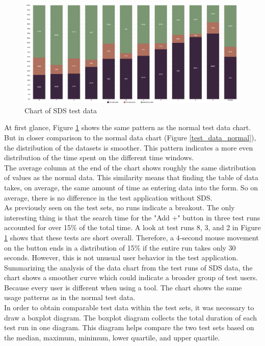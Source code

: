 \begin{figure}[htbp]
    \centerline{
    \includegraphics[width=\linewidth]{images/sds_test_data_chart.png}}
\caption{Chart of \ac{SDS} test data}
\label{test_data_sds}
\end{figure}
At first glance, Figure \ref{test_data_sds} shows the same pattern as the normal test data chart. But in closer comparison to the normal data chart (Figure \ref{test_data_normal}), the distribution of the datasets is smoother. This pattern indicates a more even distribution of the time spent on the different time windows. \\
The average column at the end of the chart shows roughly the same distribution of values as the normal data. This similarity means that finding the table of data takes, on average, the same amount of time as entering data into the form. So on average, there is no difference in the test application without \ac{SDS}. \\
As previously seen on the test sets, no runs indicate a breakout. The only interesting thing is that the search time for the "Add +" button in three test runs accounted for over 15\% of the total time. A look at test runs 8, 3, and 2 in Figure \ref{test_data_sds} shows that these tests are short overall. Therefore, a 4-second mouse movement on the button ends in a distribution of 15\% if the entire run takes only 30 seconds. However, this is not unusual user behavior in the test application.\\
Summarizing the analysis of the data chart from the test runs of SDS data, the chart shows a smoother curve which could indicate a broader group of test users. Because every user is different when using a tool. The chart shows the same usage patterns as in the normal test data.  \\

In order to obtain comparable test data within the test sets, it was necessary to draw a boxplot diagram. The boxplot diagram collects the total duration of each test run in one diagram. This diagram helps compare the two test sets based on the median, maximum, minimum, lower quartile, and upper quartile. \\

